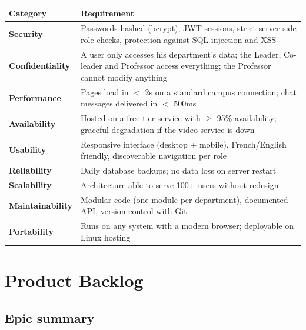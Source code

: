 \documentclass[12pt,a4paper]{report}
\begin{document}
\begin{center}
\begin{tabular}{>{\bfseries}p{2.8cm} p{11cm}}
\toprule
\textbf{Category} & \textbf{Requirement} \\
\midrule
Security & Passwords hashed (bcrypt), JWT sessions, strict server-side role checks,
           protection against SQL injection and XSS \\
Confidentiality & A user only accesses his department's data; the Leader, Co-leader and
           Professor access everything; the Professor cannot modify anything \\
Performance & Pages load in $<$ 2s on a standard campus connection; chat messages
           delivered in $<$ 500ms \\
Availability & Hosted on a free-tier service with $\geq$ 95\% availability; graceful
           degradation if the video service is down \\
Usability & Responsive interface (desktop + mobile), French/English friendly,
           discoverable navigation per role \\
Reliability & Daily database backups; no data loss on server restart \\
Scalability & Architecture able to serve 100+ users without redesign \\
Maintainability & Modular code (one module per department), documented API, version
           control with Git \\
Portability & Runs on any system with a modern browser; deployable on Linux hosting \\
\bottomrule
\end{tabular}
\end{center}

\section{Product Backlog}
\label{sec:backlog}

\subsection{Epic summary}
\end{document}
